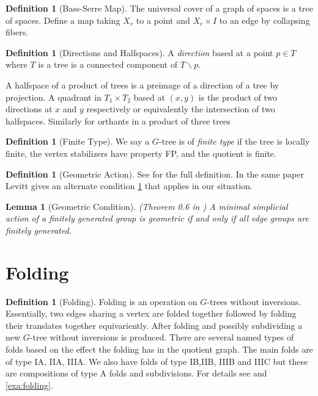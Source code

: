 \documentclass[12pt,parskip=full]{report}
\theoremstyle{plain}
\newtheorem{lem}[thm]{Lemma}
\theoremstyle{definition}
\newtheorem{dfn}[thm]{Definition}
\begin{document}
\begin{dfn}
    [Bass-Serre Map]
    \label{defn:bsmap}
    The universal cover of a graph of spaces is a tree of spaces. Define a map taking $X_v$ to a point and $X_e \times I$ to an edge by collapsing fibers.
\end{dfn}


\begin{dfn}
    [Directions and Halfspaces]
    \label{dfn:directionhalfspaces}
    A \emph{direction} based at a point \(p\in T\) where \(T\) is a tree is a connected component of \(T\smallsetminus p\).
    
    A halfspace of a product of trees is a preimage of a direction of a tree by projection. A quadrant in \(T_1\times T_2\) based at \((x,y)\) is the product of two directions at \(x\) and \(y\) respectively or equivalently the intersection of two halfspaces. Similarly for orthants in a product of three trees
\end{dfn}


\begin{dfn}
    [Finite Type]
    \label{defn:finitetype} 
    We say a $G$-tree is of \emph{finite type} if the tree is locally finite, the vertex stabilizers have property FP, and the quotient is finite.
\end{dfn}


 \begin{dfn}
     [Geometric Action]
     \label{defn:geometricaction}
     See \cite{levitt} for the full definition. In the same paper Levitt gives an alternate condition \ref{lem:simpgeo} that applies in our situation.
 \end{dfn}
\begin{lem}
    [Geometric Condition]
    \label{lem:simpgeo} 
    (Theorem 0.6 in \cite{levitt})
    A minimal simplicial action of a finitely generated group is geometric if and only if all edge groups are finitely generated.
\end{lem}

\section{Folding} 

\begin{dfn}
    [Folding]
    \label{defn:folding}
    Folding is an operation on \(G\)-trees without inversions. Essentially, two edges sharing a vertex are folded together followed by folding their translates together equivariently. After folding and possibly subdividing a new \(G\)-tree without inversions is produced. There are several named types of folds based on the effect the folding has in the quotient graph. The main folds are of type IA, IIA, IIIA. We also have folds of type IB,IIB, IIIB and IIIC but these are compositions of type A folds and subdivisions. For details see \cite{boundingcomplexity} and \ref{exa:folding}.
\end{dfn}
\end{document}
